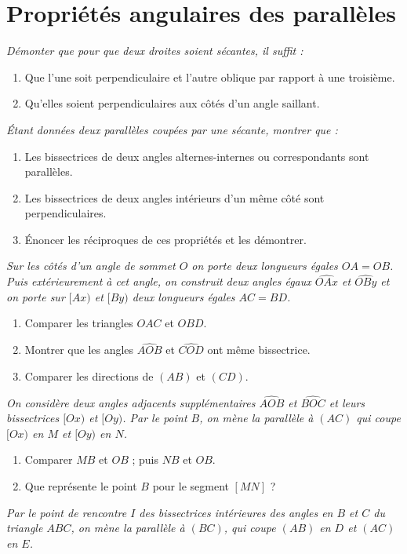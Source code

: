 \chapter{Propriétés angulaires des parallèles}


\begin{itemize}
\it Démonter que pour que deux droites soient sécantes, il suffit : 
\begin{enumerate}
\item Que l'une soit perpendiculaire et l'autre oblique par rapport à une troisième.
\item Qu'elles soient perpendiculaires aux côtés d'un angle saillant.
\end{enumerate}
\it Étant données deux parallèles coupées par une sécante, montrer que : 
\begin{enumerate}
\item Les bissectrices de deux angles alternes-internes ou correspondants sont parallèles. 
\item Les bissectrices de deux angles intérieurs d'un même côté sont perpendiculaires. 
\item Énoncer les réciproques de ces propriétés et les démontrer. 
\end{enumerate}
\it Sur les côtés d'un angle de sommet $O$ on porte deux longueurs égales $OA=OB$. Puis extérieurement à cet angle, on construit deux angles égaux $\widehat{OAx}$ et $\widehat{OBy}$ et on porte sur $[Ax)$ et $[By)$ deux longueurs égales $AC=BD$.\begin{enumerate}
\item Comparer les triangles $OAC$ et $OBD$.
\item Montrer que les angles $\widehat{AOB}$ et $\widehat{COD}$ ont même bissectrice.
\item Comparer les directions de $(AB)$ et $(CD)$.
\end{enumerate}
\it On considère deux angles adjacents supplémentaires $\widehat{AOB}$ et $\widehat{BOC}$ et leurs bissectrices $[Ox)$ et $[Oy)$. Par le point $B$, on mène la parallèle à $(AC)$ qui coupe $[Ox)$ en $M$ et $[Oy)$ en $N$.\begin{enumerate}
\item Comparer $MB$ et $OB$ ; puis $NB$ et $OB$.
\item Que représente le point $B$ pour le segment $[MN]$ ?
\end{enumerate}
\it Par le point de rencontre $I$ des bissectrices intérieures des angles en $B$ et $C$ du triangle $ABC$, on mène la parallèle à $(BC)$, qui coupe $(AB)$ en $D$ et $(AC)$ en $E$. \begin{enumerate}

\end{enumerate}
\end{itemize}
